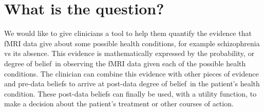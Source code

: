 \documentclass[\ifafour a4paper,12pt,\else a5paper,10pt,\fi%
onecolumn,oneside,article,%
british%
]{memoir}
\title{\propertitle}
\author{%
\hspace*{\stretch{1}}%
\parbox{0.5\linewidth}%
{\protect\centering P.G.L.  Porta Mana\\%
\footnotesize\epost{\email{piero.mana}{ntnu.no}}}%
\hspace*{\stretch{1}}%
}
\date{Draft of \today\ (first drafted \firstdraft)}
\theoremstyle{remark}
\theoremstyle{innote}
\newcommand*{\amp}{\&}
\newcommand*{\asudedication}[1]{%
{\par\centering\textit{#1}\par}}
\renewcommand*{\|}[1][]{\nonscript\,#1\vert\nonscript\;\mathopen{}}
\newcommand*{\dob}{degree of belief}
\begin{document}
\captiondelim{\quad}\captionnamefont{\footnotesize}\captiontitlefont{\footnotesize}
\frenchspacing
\maketitle

\abstractrunin
\abslabeldelim{}
\renewcommand*{\abstractname}{}
\setlength{\absleftindent}{0pt}
\setlength{\absrightindent}{0pt}
\setlength{\abstitleskip}{-\absparindent}
\begin{abstract}%
  \noindent ***
\\\noindent\emph{\footnotesize Note: Dear Reader
    \amp\ Peer, this manuscript is being peer-reviewed by you. Thank you.}
\end{abstract}
\frenchspacing





\section{What is the question?}
\label{sec:intro}

We would like to give clinicians a tool to help them quantify the evidence
that fMRI data give about some possible health conditions, for example
schizophrenia vs its absence. This evidence is mathematically expressed by
the probability, or \dob\ in observing the fMRI data given each of the
possible health conditions. The clinician can combine this evidence with
other pieces of evidence and pre-data beliefs to arrive at post-data \dob\
in the patient's health condition. These post-data beliefs can finally be
used, with a utility function, to make a decision about the patient's
treatment or other courses of action.
\end{document}
